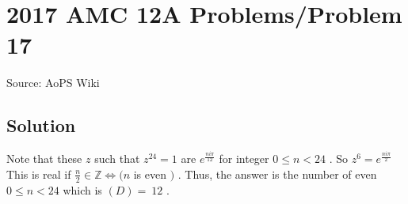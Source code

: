 \documentclass[12pt]{article}
\begin{document}
\section*{{2017 AMC 12A Problems/Problem 17}}
Source: AoPS Wiki

\subsection*{Solution}
Note that these $z$ such that $z^{24}=1$ are $e^{\frac{ni\pi}{12}}$ for integer $0\leq n<24$ . So $z^6=e^{\frac{ni\pi}{2}}$ This is real if $\frac{n}{2}\in \mathbb{Z} \Leftrightarrow (n$ is even $)$ . Thus, the answer is the number of even $0\leq n<24$ which is $\boxed{(D)=\ 12}$ .
\end{document}
